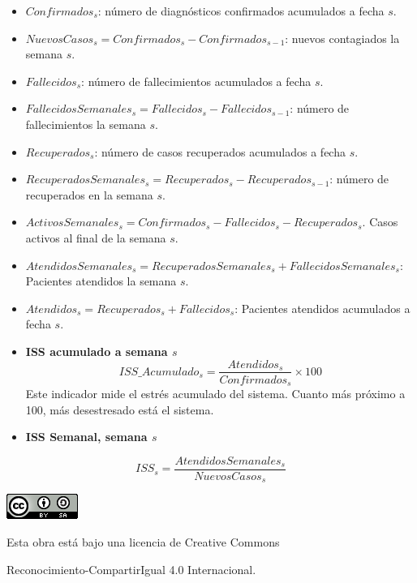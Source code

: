 \documentclass[
  11pt,
]{article}
\begin{document}
\begin{itemize}
\item
  \(Confirmados_s\): número de diagnósticos confirmados acumulados a
  fecha \(s\).
\item
  \(NuevosCasos_{s} = Confirmados_{s} - Confirmados_{s-1}\): nuevos
  contagiados la semana \(s\).
\item
  \(Fallecidos_s\): número de fallecimientos acumulados a fecha \(s\).
\item
  \(FallecidosSemanales_s = Fallecidos_{s} - Fallecidos_{s-1}\): número
  de fallecimientos la semana \(s\).
\item
  \(Recuperados_s\): número de casos recuperados acumulados a fecha
  \(s\).
\item
  \(RecuperadosSemanales_{s} = Recuperados_{s} - Recuperados_{s-1}\):
  número de recuperados en la semana \(s\).
\item
  \(ActivosSemanales_s = Confirmados_s - Fallecidos_s - Recuperados_s\).
  Casos activos al final de la semana \(s\).
\item
  \(AtendidosSemanales_{s} = RecuperadosSemanales_s + FallecidosSemanales_s\):
  Pacientes atendidos la semana \(s\).
\item
  \(Atendidos_{s} = Recuperados_s + Fallecidos_s\): Pacientes atendidos
  acumulados a fecha \(s\).
\item
  \textbf{ISS acumulado a semana \(s\)}
  \[ISS\_Acumulado_s = \frac{Atendidos_s}{Confirmados_s} \times 100\]
  Este indicador mide el estrés acumulado del sistema. Cuanto más
  próximo a 100, más desestresado está el sistema.
\item
  \textbf{ISS Semanal, semana \(s\)}
\end{itemize}

\[
ISS_s = \frac{AtendidosSemanales_s}{NuevosCasos_{s}}
\]

\vspace{4cm}

\begin{center}
\includegraphics{cc.png}
\end{center}

\vspace{0.2cm}

\begin{center}
Esta obra está bajo una licencia de Creative Commons 
\end{center}

\begin{center}
Reconocimiento-CompartirIgual 4.0 Internacional.
\end{center}
\end{document}
